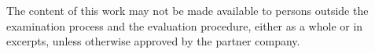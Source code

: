 The content of this work may not be made available to persons outside the examination process and the evaluation procedure, either as a whole or in excerpts, unless otherwise approved by the partner company.
